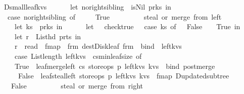 \begin{isabellebody}
\ \ {\isacharbar}\ D{\isacharunderscore}small{\isacharunderscore}leaf{\isacharparenleft}kvs{\isacharparenright}\ {\isasymRightarrow}\ {\isacharparenleft}\isanewline
\ \ \ \ let\ no{\isacharunderscore}right{\isacharunderscore}sibling\ {\isacharequal}\ is{\isacharunderscore}Nil{\isacharprime}\ {\isacharparenleft}p{\isacharbar}{\isachargreater}r{\isacharunderscore}ks{}{\isacharparenright}\ in\isanewline
\ \ \ \ case\ no{\isacharunderscore}right{\isacharunderscore}sibling\ of\ \isanewline
\ \ \ \ True\ {\isasymRightarrow}\ {\isacharparenleft}\isanewline
\ \ \ \ \ \ {\isacharparenleft}{\isacharasterisk}\ steal\ or\ merge\ from\ left\ {\isacharasterisk}{\isacharparenright}\isanewline
\ \ \ \ \ \ let\ ks{}\ {\isacharequal}\ p{\isacharbar}{\isachargreater}r{\isacharunderscore}ks{}\ in\isanewline
\ \ \ \ \ \ let\ {\isacharunderscore}\ {\isacharequal}\ check{\isacharunderscore}true\ {\isacharparenleft}{\isacharpercent}\ {\isacharunderscore}{\isachardot}\ case\ ks{}\ of\ {\isacharbrackleft}{\isacharbrackright}\ {\isasymRightarrow}\ False\ {\isacharbar}\ {\isacharunderscore}\ {\isasymRightarrow}\ True{\isacharparenright}\ in\isanewline
\ \ \ \ \ \ let\ r\ {\isacharequal}\ List{\isachardot}hd\ {\isacharparenleft}p{\isacharbar}{\isachargreater}r{\isacharunderscore}ts{}{\isacharparenright}\ in\isanewline
\ \ \ \ \ \ r\ {\isacharbar}{\isachargreater}\ read\ {\isacharbar}{\isachargreater}\ fmap\ {\isacharparenleft}{\isacharpercent}\ frm{\isachardot}\ dest{\isacharunderscore}Disk{\isacharunderscore}leaf\ frm{\isacharparenright}\ {\isacharbar}{\isachargreater}\ bind\ {\isacharparenleft}{\isacharpercent}\ left{\isacharunderscore}kvs{\isachardot}\ \isanewline
\ \ \ \ \ \ case\ List{\isachardot}length\ left{\isacharunderscore}kvs\ {\isacharequal}\ cs{\isacharbar}{\isachargreater}min{\isacharunderscore}leaf{\isacharunderscore}size\ of\isanewline
\ \ \ \ \ \ True\ {\isasymRightarrow}\ leaf{\isacharunderscore}merge{\isacharunderscore}left\ cs\ store{\isacharunderscore}ops\ p\ left{\isacharunderscore}kvs\ kvs\ {\isacharbar}{\isachargreater}\ bind\ post{\isacharunderscore}merge\isanewline
\ \ \ \ \ \ {\isacharbar}\ False\ {\isasymRightarrow}\ leaf{\isacharunderscore}steal{\isacharunderscore}left\ store{\isacharunderscore}ops\ p\ left{\isacharunderscore}kvs\ kvs\ {\isacharbar}{\isachargreater}\ fmap\ D{\isacharunderscore}updated{\isacharunderscore}subtree{\isacharparenright}{\isacharparenright}\isanewline
\ \ \ \ {\isacharbar}\ False\ {\isasymRightarrow}\ {\isacharparenleft}\isanewline
\ \ \ \ \ \ {\isacharparenleft}{\isacharasterisk}\ steal\ or\ merge\ from\ right\ {\isacharasterisk}{\isacharparenright}\isanewline

\end{isabellebody}
